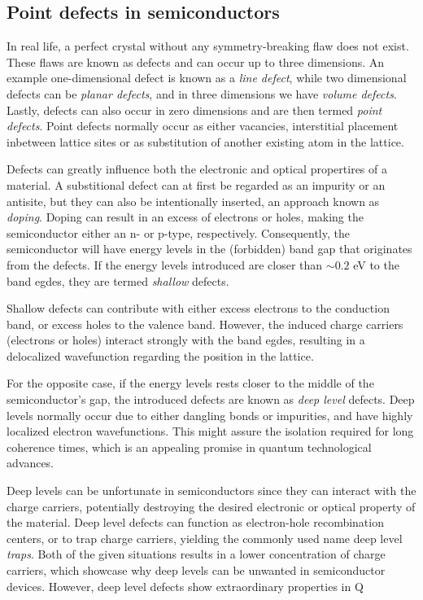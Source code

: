 \subsection{Point defects in semiconductors}

In real life, a perfect crystal without any symmetry-breaking flaw does not exist. These flaws are known as defects and can occur up to three dimensions. An example one-dimensional defect is known as a \textit{line defect}, while two dimensional defects can be \textit{planar defects}, and in three dimensions we have \textit{volume defects}. Lastly, defects can also occur in zero dimensions and are then termed \textit{point defects}. Point defects normally occur as either vacancies, interstitial placement inbetween lattice sites or as substitution of another existing atom in the lattice.

Defects can greatly influence both the electronic and optical propertires of a material. A substitional defect can at first be regarded as an impurity or an antisite, but they can also be intentionally inserted, an approach known as \textit{doping}. Doping can result in an excess of electrons or holes, making the semiconductor either an n- or p-type, respectively. Consequently, the semiconductor will have energy levels in the (forbidden) band gap that originates from the defects. If the energy levels introduced are closer than $ \sim 0.2$ eV to the band egdes, they are termed \textit{shallow} defects.

Shallow defects can contribute with either excess electrons to the conduction band, or excess holes to the valence band. However, the induced charge carriers (electrons or holes) interact strongly with the band egdes, resulting in a delocalized wavefunction regarding the position in the lattice. %

For the opposite case, if the energy levels rests closer to the middle of the semiconductor's gap, the introduced defects are known as \textit{deep level} defects. Deep levels normally occur due to either dangling bonds or impurities, and have highly localized electron wavefunctions. This might assure the isolation required for long coherence times, which is an appealing promise in quantum technological advances.

Deep levels can be unfortunate in semiconductors since they can interact with the charge carriers, potentially destroying the desired electronic or optical property of the material. Deep level defects can function as electron-hole recombination centers, or to trap charge carriers, yielding the commonly used name deep level \textit{traps}. Both of the given situations results in a lower concentration of charge carriers, which showcase why deep levels can be unwanted in semiconductor devices. However, deep level defects show extraordinary properties in Q

